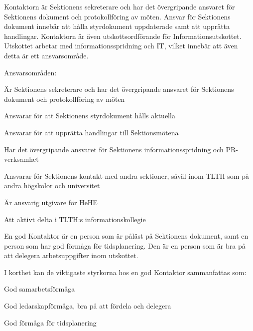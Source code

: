 \documentclass[10pt]{article}
\def\post{Kontaktor}
\def\doctitle{Kravprofil för \post}
\begin{document}
    \heading{\doctitle}
    
    
    Kontaktorn är Sektionens sekreterare och har det övergripande ansvaret för Sektionens dokument och
    protokollföring av möten. Ansvar för Sektionens dokument innebär att hålla styrdokument
    uppdaterade samt att upprätta handlingar. Kontaktorn är även utskottsordförande för
    Informationsutskottet. Utskottet arbetar med informationsspridning och IT, vilket
    innebär att även detta är ett ansvarsområde.
    
    Ansvarsområden:
    \begin{dashlist}
        \item Är Sektionens sekreterare och har det övergripande ansvaret för Sektionens dokument och
        protokollföring av möten
        \item Ansvarar för att Sektionens styrdokument hålls aktuella
        \item Ansvarar för att upprätta handlingar till Sektionsmötena
        \item Har det övergripande ansvaret för Sektionens informationsspridning och PR-verksamhet
        \item Ansvarar för Sektionens kontakt med andra sektioner, såväl inom TLTH som på andra
        högskolor och universitet
        \item Är ansvarig utgivare för HeHE
        \item Att aktivt delta i TLTH:s informationskollegie
    \end{dashlist}
    
    En god Kontaktor är en person som är påläst på Sektionens dokument, samt en person som
    har god förmåga för tidsplanering. Den är en person som är bra på att delegera
    arbetsuppgifter inom utskottet. 
    
    I korthet kan de viktigaste styrkorna hos en god {\post} sammanfattas som:
    \begin{dashlist}
        \item God samarbetsförmåga
        \item God ledarskapförmåga, bra på att fördela och delegera
        \item God förmåga för tidsplanering
    \end{dashlist}
    
\end{document}
